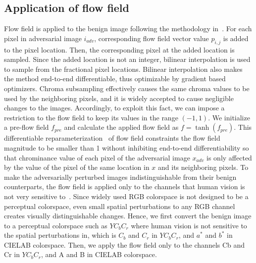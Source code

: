 \subsection{Application of flow field}
Flow field is applied to the benign image following the methodology in~\cite{xiao2018spatially}. For each pixel in adversarial image \(i_{adv}\), corresponding flow field vector value \(p_{i,j}\) is added to the pixel location. Then, the corresponding pixel at the added location is sampled. Since the added location is not an integer, bilinear interpolation is used to sample from the fractional pixel locations. Bilinear interpolation also makes the method end-to-end differentiable, thus optimizable by gradient based optimizers.
Chroma subsampling effectively causes the same chroma values to be used by the neighboring pixels, and it is widely accepted to cause negligible changes to the images. Accordingly, to exploit this fact, we can impose a restriction to the flow field to keep its values in the range \((-1, 1)\). We initialize a pre-flow field \(f_{pre}\) and calculate the applied flow field as \(f = \tanh(f_{pre})\). This differentiable reparameterization~\cite{mordvintsev2018differentiable} of flow field constraints the flow field magnitude to be smaller than 1 without inhibiting end-to-end differentiability so that chrominance value of each pixel of the adversarial image \(x_{adv}\) is only affected by the value of the pixel of the same location in \(x\) and its neighboring pixels. %
To make the adversarially perturbed images indistinguishable from their benign counterparts, the flow field is applied only to the channels that human vision is not very sensitive to~\cite{vorobyev2004ecology}. Since widely used RGB colorspace is not designed to be a perceptual colorspace, even small spatial perturbations to any RGB channel creates visually distinguishable changes. Hence, we first convert the benign image to a perceptual colorspace such as \(YC_{b}C_{r}\) where human vision is not sensitive to the spatial perturbations in, which is \(C_{b}\) and \(C_{r}\) in \(YC_{b}C_{r}\), and \(a^*\) and \(b^*\) in CIELAB colorspace. Then, we apply the flow field only to the channels Cb and Cr in \(YC_{b}C_{r}\), and A and B in CIELAB colorspace.


